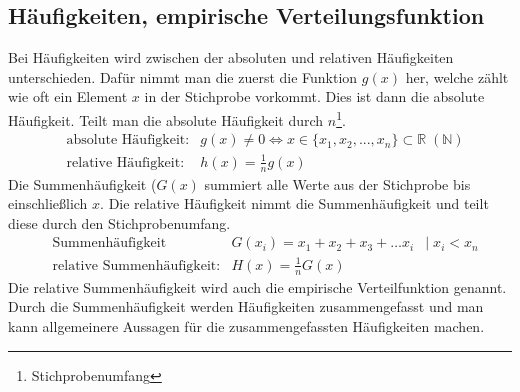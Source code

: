 \documentclass[a4paper]{scrartcl}
\begin{document}
        \subsection{Häufigkeiten, empirische Verteilungsfunktion}
            Bei Häufigkeiten wird zwischen der absoluten und relativen Häufigkeiten unterschieden. Dafür nimmt man die zuerst die Funktion \(g(x)\) her, welche zählt wie oft
            ein Element \(x\) in der Stichprobe vorkommt. Dies ist dann die absolute Häufigkeit. Teilt man die absolute Häufigkeit durch \(n\)\footnote{Stichprobenumfang}.
            \begin{equation*}
                \begin{aligned}
                    & \text{absolute Häufigkeit:} & g(x) \neq 0 \Leftrightarrow x \in \{ x_1,x_2,..., x_n\} \subset \mathbb{R} \; (\mathbb{N}) \\
                    & \text{relative Häufigkeit:} & h(x) = \frac{1}{n} g(x) 
                \end{aligned}
            \end{equation*}    
            Die Summenhäufigkeit (\(G(x)\) summiert alle Werte aus der Stichprobe bis einschließlich \(x\). Die relative Häufigkeit nimmt die Summenhäufigkeit und teilt
            diese durch den Stichprobenumfang.
            \begin{equation*}
                \begin{aligned}
                    & \text{Summenhäufigkeit} & G(x_i) = x_1 + x_2 + x_3 + \ldots x_i & | \; x_i < x_n  \\
                    & \text{relative Summenhäufigkeit:} & H(x) = \frac{1}{n} G(x) &  
                \end{aligned}
            \end{equation*}  
            Die relative Summenhäufigkeit wird auch die empirische Verteilfunktion genannt. Durch die Summenhäufigkeit werden Häufigkeiten zusammengefasst und man kann
            allgemeinere Aussagen für die zusammengefassten Häufigkeiten machen.
\end{document}
